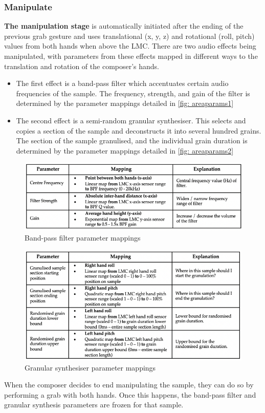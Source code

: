 \subsubsection{Manipulate}                      \label{sec: area-system-software-manip}
\textbf{The manipulation stage} is automatically initiated after the ending of the previous grab gesture and uses translational (x, y, z) and rotational (roll, pitch) values from both hands when above the LMC. There are two audio effects being manipulated, with parameters from these effects mapped in different ways to the translation and rotation of the composer's hands.
\begin{itemize}
    \item The first effect is a band-pass filter which accentuates certain audio frequencies of the sample. The frequency, strength, and gain of the filter is determined by the parameter mappings detailed in \autoref{fig: areaparams1}
    \item The second effect is a semi-random granular synthesiser. This selects and copies a section of the sample and deconstructs it into several hundred grains. The section of the sample granulised, and the individual grain duration is determined by the parameter mappings detailed in \autoref{fig: areaparams2} 
\end{itemize}
\begin{figure}
    \centering
    \includegraphics[width=0.8\linewidth]{figures/05-area/areatechnical_param1.png}
    \caption{Band-pass filter parameter mappings}
    \label{fig: areaparams1}
\end{figure}

\begin{figure}
    \centering
    \includegraphics[width=0.8\linewidth]{figures/05-area/areatechnical_param2.png}
    \caption{Granular synthesiser parameter mappings}
    \label{fig: areaparams2}
\end{figure}
When the composer decides to end manipulating the sample, they can do so by performing a grab with both hands. Once this happens, the band-pass filter and granular synthesis parameters are frozen for that sample.


